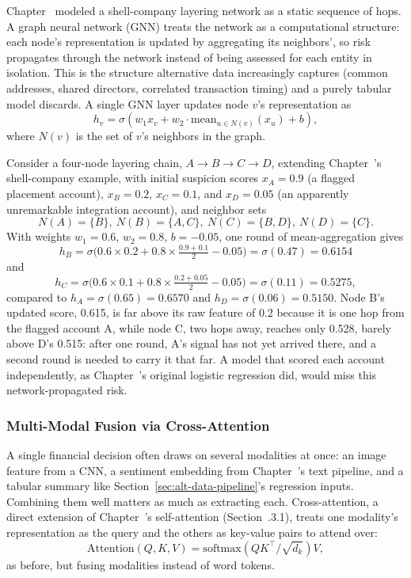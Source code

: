 \documentclass[../ai_in_finance]{subfiles}
\begin{document}
Chapter~ modeled a shell-company layering network as a static sequence of hops. A graph neural network (GNN) treats the network as a computational structure: each node's representation is updated by aggregating its neighbors', so risk propagates through the network instead of being assessed for each entity in isolation. This is the structure alternative data increasingly captures (common addresses, shared directors, correlated transaction timing) and a purely tabular model discards. A single GNN layer updates node $v$'s representation as
\begin{equation}
h_v = \sigma(w_1 x_v + w_2 \cdot \text{mean}_{u \in N(v)}(x_u) + b),
\label{eq:altdata-gnn}
\end{equation}
where $N(v)$ is the set of $v$'s neighbors in the graph.

Consider a four-node layering chain, $A \to B \to C \to D$, extending Chapter~'s shell-company example, with initial suspicion scores $x_A = 0.9$ (a flagged placement account), $x_B = 0.2$, $x_C = 0.1$, and $x_D = 0.05$ (an apparently unremarkable integration account), and neighbor sets
$$N(A)=\{B\},\ N(B)=\{A,C\},\ N(C)=\{B,D\},\  N(D)=\{C\}.$$
 With weights $w_1=0.6$, $w_2=0.8$, $b=-0.05$, one round of mean-aggregation gives
$$h_B = \sigma\big(0.6 \times 0.2 + 0.8 \times \tfrac{0.9+0.1}{2} - 0.05\big) = \sigma(0.47) = 0.6154$$ and
$$h_C = \sigma\big(0.6 \times 0.1 + 0.8 \times \tfrac{0.2+0.05}{2} - 0.05\big) = \sigma(0.11) = 0.5275,$$
compared to $h_A = \sigma(0.65) = 0.6570$ and $h_D = \sigma(0.06) = 0.5150$. Node B's updated score, 0.615, is far above its raw feature of 0.2 because it is one hop from the flagged account A, while node C, two hops away, reaches only 0.528, barely above D's 0.515: after one round, A's signal has not yet arrived there, and a second round is needed to carry it that far. A model that scored each account independently, as Chapter~'s original logistic regression did, would miss this network-propagated risk.

\subsubsection*{Multi-Modal Fusion via Cross-Attention}

A single financial decision often draws on several modalities at once: an image feature from a CNN, a sentiment embedding from Chapter~'s text pipeline, and a tabular summary like Section~\ref{sec:alt-data-pipeline}'s regression inputs. Combining them well matters as much as extracting each. Cross-attention, a direct extension of Chapter~'s self-attention (Section~.3.1), treats one modality's representation as the query and the others as key-value pairs to attend over:
$$\text{Attention}(Q,K,V) = \text{softmax}(QK^\top/\sqrt{d_k})V,$$
as before, but fusing modalities instead of word tokens.
\end{document}

